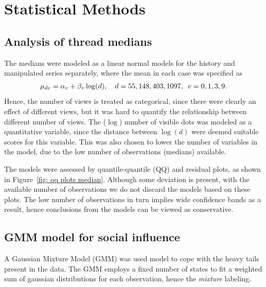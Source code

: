 \documentclass[9pt,a4paper,twocolumn,lineno]{article}
\begin{document}
\section*{Statistical Methods}
\subsection*{Analysis of thread medians}
The medians were modeled as a linear normal models for the history and manipulated series separately, where the mean in each case was specified as
\begin{align*}
	\mu_{dv} = \alpha_v+\beta_v\log(d), \quad d=55, 148, 403, 1097, \enskip v=0,1,3,9 .
\end{align*}
Hence, the number of views is treated as categorical, since there were clearly an effect of different views, but it was hard to quantify the relationship between different number of views. The ($\log$) number of visible dots was modeled as a quantitative variable, since the distance between $\log(d)$ were deemed suitable scores for this variable. This was also chosen to lower the number of variables in the model, due to the low number of observations (medians) available. 

The models were assessed by quantile-quantile (QQ) and residual plots, as shown in Figure~\ref{fig: qq plots median}. Although some deviation is present, with the available number of observations we do not discard the models based on these plots. The low number of observations in turn implies wide confidence bands as a result, hence conclusions from the models can be viewed as conservative. 

\subsection*{GMM model for social influence}
A Gaussian Mixture Model (GMM) was used model to cope with the heavy tails present in the data. The GMM employs a fixed number of states to fit a weighted sum of gaussian distributions for each observation, hence the \emph{mixture} labeling.
\end{document}
